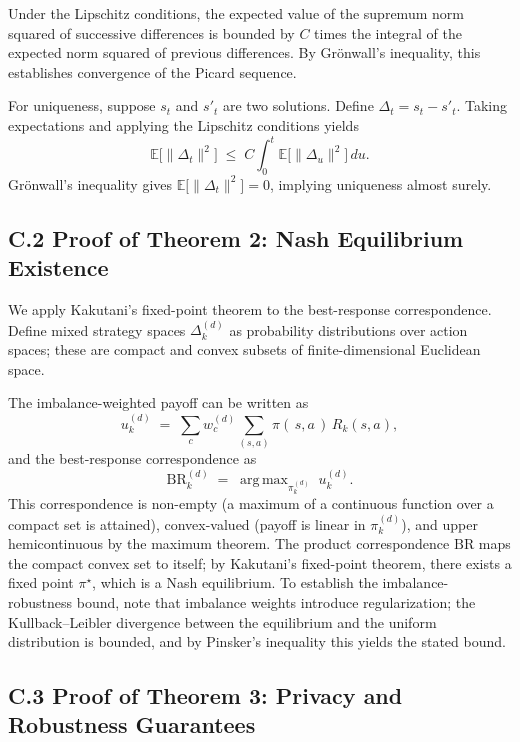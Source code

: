 \documentclass[12pt,a4paper]{article}
\theoremstyle{definition}
\DeclareMathOperator*{\argmax}{arg\,max}
\begin{document}
Under the Lipschitz conditions, the expected value of the supremum norm squared of successive differences is bounded by \(C\) times the integral of the expected norm squared of previous differences. By Grönwall’s inequality, this establishes convergence of the Picard sequence.

For uniqueness, suppose \(s_t\) and \(s'_t\) are two solutions. Define \(\Delta_t=s_t-s'_t\). Taking expectations and applying the Lipschitz conditions yields
\[
\mathbb{E}\big[\|\Delta_t\|^{2}\big] \;\le\; C\int_{0}^{t}\mathbb{E}\big[\|\Delta_u\|^{2}\big]\,du.
\]
Grönwall’s inequality gives \(\mathbb{E}\big[\|\Delta_t\|^{2}\big]=0\), implying uniqueness almost surely.

\endgroup

\subsection{C.2 Proof of Theorem 2: Nash Equilibrium Existence}

\begingroup
\setlength{\emergencystretch}{2em}

We apply Kakutani’s fixed-point theorem to the best-response correspondence. Define mixed strategy spaces \(\Delta_k^{(d)}\) as probability distributions over action spaces; these are compact and convex subsets of finite-dimensional Euclidean space.

The imbalance-weighted payoff can be written as
\[
u_k^{(d)} \;=\; \sum_{c} w_c^{(d)} \sum_{(s,a)} \pi(\,s,a\,)\,R_k(s,a),
\]
and the best-response correspondence as
\[
\mathrm{BR}_k^{(d)} \;=\; \argmax_{\pi_k^{(d)}} \; u_k^{(d)}.
\]
This correspondence is non-empty (a maximum of a continuous function over a compact set is attained), convex-valued (payoff is linear in \(\pi_k^{(d)}\)), and upper hemicontinuous by the maximum theorem. The product correspondence \(\mathrm{BR}\) maps the compact convex set to itself; by Kakutani’s fixed-point theorem, there exists a fixed point \(\pi^{\star}\), which is a Nash equilibrium. To establish the imbalance-robustness bound, note that imbalance weights introduce regularization; the Kullback–Leibler divergence between the equilibrium and the uniform distribution is bounded, and by Pinsker’s inequality this yields the stated bound.

\endgroup

\subsection{C.3 Proof of Theorem 3: Privacy and Robustness Guarantees}
\end{document}
